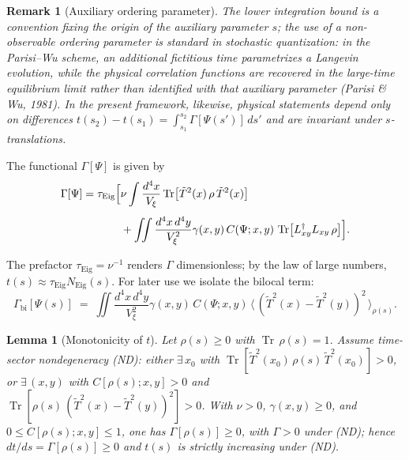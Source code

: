 \documentclass[12pt,a4paper]{article}
\newtheorem{lemma}{Lemma}[section]
\newtheorem{remark}{Remark}[section]
\renewcommand{\Tr}{\operatorname{Tr}}
\newcommand{\Vxi}{V_\xi}          %
\newcommand{\intx}{\int \frac{d^4x}{\Vxi}}
\newcommand{\intxy}{\iint \frac{d^4x\,d^4y}{\Vxi^2}}
\numberwithin{equation}{section}
\begin{document}
\begin{remark}[Auxiliary ordering parameter]
The lower integration bound is a convention fixing the origin of the auxiliary
parameter $s$; the use of a non-observable ordering parameter is
standard in stochastic quantization: in the Parisi--Wu scheme, an
additional fictitious time parametrizes a Langevin evolution, while the
physical correlation functions are recovered in the large-time equilibrium
limit rather than identified with that auxiliary parameter (Parisi \& Wu,
1981). In the present framework, likewise, physical statements depend only on differences
$t(s_2)-t(s_1)=\int_{s_1}^{s_2}\Gamma[\Psi(s')]\,ds'$ and are invariant under $s$-translations.
\end{remark}

\noindent The functional $\Gamma[\Psi]$ is given by
\begin{equation}
\begin{split}
\Gamma[\Psi] = \tau_{\mathrm{Eig}} \Bigl[
&\nu \intx \Tr\bigl[\tilde{T}^2(x)\,\rho\,\tilde{T}^2(x)\bigr] \\[4pt]
&+ \intxy \gamma(x,y)\,C(\Psi;x,y)\,\Tr\bigl[L_{xy}^\dagger L_{xy}\,\rho\bigr]
\Bigr].
\end{split}
\label{eq:gamma-decomposition}
\end{equation}

The prefactor $\tau_{\mathrm{Eig}}=\nu^{-1}$ renders $\Gamma$ dimensionless; by the law of large numbers, $t(s)\approx \tau_{\mathrm{Eig}}N_{\mathrm{Eig}}(s)$. For later use we isolate the bilocal term:
\begin{equation}
\Gamma_{\mathrm{bi}}[\Psi(s)] \;=\; 
\intxy \gamma(x,y)\,C(\Psi;x,y)\,
\big\langle\,(\tilde{T}^2(x)-\tilde{T}^2(y))^2\,\big\rangle_{\rho(s)}.
\label{eq:Gamma-bilocal}
\end{equation}

\begin{lemma}[Monotonicity of $t$]
\label{lem:Gamma-positive}
Let $\rho(s)\!\ge\!0$ with $\Tr\,\rho(s)=1$. Assume time-sector
nondegeneracy (ND): either $\exists\,x_0$ with
$\Tr[\tilde{T}^2(x_0)\,\rho(s)\,\tilde{T}^2(x_0)]>0$, or $\exists\,(x,y)$ with
$C[\rho(s);x,y]>0$ and
$\Tr[\rho(s)\,( \tilde{T}^2(x)-\tilde{T}^2(y) )^2]>0$. With $\nu>0$,
$\gamma(x,y)\ge 0$, and $0\le C[\rho(s);x,y]\le 1$, one has
$\Gamma[\rho(s)]\ge 0$, with $\Gamma>0$ under (ND); hence $dt/ds=\Gamma[\rho(s)]\ge 0$ and $t(s)$ is strictly
increasing under (ND).
\end{lemma}
\end{document}
